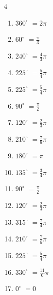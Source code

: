 \begin{multicols}{4}
\begin{enumerate}
  \item $\displaystyle 360^{\circ}$
        $\displaystyle =2\pi$

  \item $\displaystyle 60^{\circ}$
        $\displaystyle =\frac{\pi}{3}$

  \item $\displaystyle 240^{\circ}$
        $\displaystyle =\frac{4}{3}\pi$

\columnbreak %

  \item $\displaystyle 225^{\circ}$
        $\displaystyle =\frac{5}{4}\pi$

  \item $\displaystyle 225^{\circ}$
        $\displaystyle =\frac{5}{4}\pi$

  \item $\displaystyle 90^{\circ}$
        $\displaystyle =\frac{\pi}{2}$

  \item $\displaystyle 120^{\circ}$
        $\displaystyle =\frac{2}{3}\pi$

  \item $\displaystyle 210^{\circ}$
        $\displaystyle =\frac{7}{6}\pi$

  \item $\displaystyle 180^{\circ}$
        $\displaystyle =\pi$

  \item $\displaystyle 135^{\circ}$
        $\displaystyle =\frac{3}{4}\pi$

  \item $\displaystyle 90^{\circ}$
        $\displaystyle =\frac{\pi}{2}$

  \item $\displaystyle 120^{\circ}$
        $\displaystyle =\frac{2}{3}\pi$

  \item $\displaystyle 315^{\circ}$
        $\displaystyle =\frac{7}{4}\pi$

  \item $\displaystyle 210^{\circ}$
        $\displaystyle =\frac{7}{6}\pi$

  \item $\displaystyle 225^{\circ}$
        $\displaystyle =\frac{5}{4}\pi$

  \item $\displaystyle 330^{\circ}$
        $\displaystyle =\frac{11}{6}\pi$

  \item $\displaystyle 0^{\circ}$
        $\displaystyle =0$


\end{enumerate}
\end{multicols}
